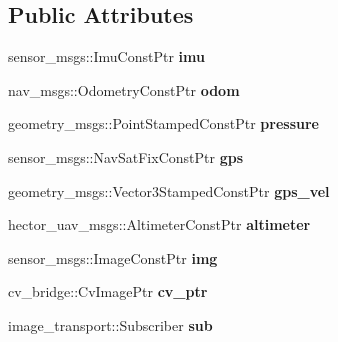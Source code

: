 \subsection*{\-Public \-Attributes}
\begin{DoxyCompactItemize}
\item 
\hypertarget{class_staterobot_ae6075d8fe1f2714e62f98ecfcfabab5f}{sensor\-\_\-msgs\-::\-Imu\-Const\-Ptr {\bfseries imu}}\label{class_staterobot_ae6075d8fe1f2714e62f98ecfcfabab5f}

\item 
\hypertarget{class_staterobot_a647d9af50a8896f64fa9456b5719157b}{nav\-\_\-msgs\-::\-Odometry\-Const\-Ptr {\bfseries odom}}\label{class_staterobot_a647d9af50a8896f64fa9456b5719157b}

\item 
\hypertarget{class_staterobot_a8ab2546d67712dbed7d288f66430d923}{geometry\-\_\-msgs\-::\-Point\-Stamped\-Const\-Ptr {\bfseries pressure}}\label{class_staterobot_a8ab2546d67712dbed7d288f66430d923}

\item 
\hypertarget{class_staterobot_aaade9f6f0d32fb6baaef1c745fa138de}{sensor\-\_\-msgs\-::\-Nav\-Sat\-Fix\-Const\-Ptr {\bfseries gps}}\label{class_staterobot_aaade9f6f0d32fb6baaef1c745fa138de}

\item 
\hypertarget{class_staterobot_a78d4a58c9335c40740c830f7d8499c75}{geometry\-\_\-msgs\-::\-Vector3\-Stamped\-Const\-Ptr {\bfseries gps\-\_\-vel}}\label{class_staterobot_a78d4a58c9335c40740c830f7d8499c75}

\item 
\hypertarget{class_staterobot_a08857351f3bb69c9590778240fcf2d78}{hector\-\_\-uav\-\_\-msgs\-::\-Altimeter\-Const\-Ptr {\bfseries altimeter}}\label{class_staterobot_a08857351f3bb69c9590778240fcf2d78}

\item 
\hypertarget{class_staterobot_abf4b6be91bd0f6be3a78ca438dc38ac2}{sensor\-\_\-msgs\-::\-Image\-Const\-Ptr {\bfseries img}}\label{class_staterobot_abf4b6be91bd0f6be3a78ca438dc38ac2}

\item 
\hypertarget{class_staterobot_aed9668b08e6c38c4008daa836fa88269}{cv\-\_\-bridge\-::\-Cv\-Image\-Ptr {\bfseries cv\-\_\-ptr}}\label{class_staterobot_aed9668b08e6c38c4008daa836fa88269}

\item 
\hypertarget{class_staterobot_a56690a2dc306e9147b373ac8f7145ffa}{image\-\_\-transport\-::\-Subscriber {\bfseries sub}}\label{class_staterobot_a56690a2dc306e9147b373ac8f7145ffa}


\end{DoxyCompactItemize}
